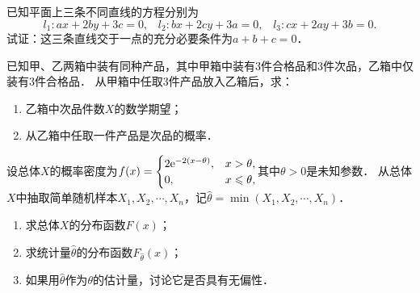 \documentclass[plain,noanswer,medmath]{../../template/jnuexam}
\begin{document}

\begin{problem}
已知平面上三条不同直线的方程分别为
$$l_1:ax + 2by + 3c = 0,\;\;\;l_2:bx + 2cy + 3a = 0,\;\;\;l_3:cx + 2ay + 3b = 0.$$
试证：这三条直线交于一点的充分必要条件为$a + b + c = 0$．
\end{problem}



\begin{problem}
已知甲、乙两箱中装有同种产品，其中甲箱中装有$3$件合格品和$3$件次品，乙箱中仅装有$3$件合格品．
从甲箱中任取$3$件产品放入乙箱后，求：
\begin{enumerate}
\item 乙箱中次品件数$X$的数学期望；
\item 从乙箱中任取一件产品是次品的概率．
\end{enumerate}
\end{problem}



\begin{problem}
设总体$X$的概率密度为$f(x) = \begin{cases}
  2\mathrm{e}^{- 2(x - \theta)}, & x > \theta , \\
  0,                     & x \leqslant \theta ,
\end{cases}$其中$\theta > 0$是未知参数．
从总体$X$中抽取简单随机样本$X_1,X_2, \cdots ,X_n$，记$\hat{\theta}= \min(X_1,X_2, \cdots ,X_n)$．
\begin{enumerate}
\item 求总体$X$的分布函数$F(x)$；
\item 求统计量$\hat{\theta}$的分布函数$F_{\hat{\theta}}(x)$；
\item 如果用$\hat{\theta}$作为$\theta$的估计量，讨论它是否具有无偏性．
\end{enumerate}
\end{problem}
\end{document}
